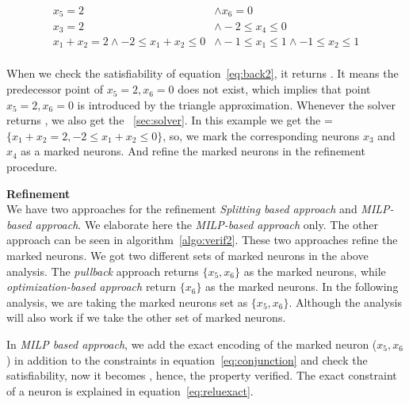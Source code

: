 \begin{equation}
    \begin{aligned}
        x_5 = 2 & \land x_6 = 0 \\
        x_3 = 2 & \land -2\leq x_4 \leq 0 \\ 
        x_1+x_2=2\land -2\leq  x_1+x_2 \leq 0 & \land -1\leq x_1 \leq 1 \land -1\leq x_2 \leq 1 \\
    \end{aligned}
\label{eq:back2}
\end{equation}

When we check the satisfiability of equation~\ref{eq:back2}, it returns \unsat{}. It means the predecessor point of 
$x_5=2,x_6=0$ does not exist, which implies that point $x_5=2, x_6=0$ is introduced by the triangle approximation.
Whenever the solver returns \unsat{}, we also get the \unsatcore{}~\ref{sec:solver}. In this example we get the 
\unsatcore{}=$\{x_1+x_2=2, -2\leq  x_1+x_2 \leq 0\}$, so, we mark the corresponding neurons $x_3$ and $x_4$ as a marked neurons. 
And refine the marked neurons in the refinement procedure. 


\textbf{Refinement} \\
We have two approaches for the refinement {\em Splitting based approach} and {\em MILP-based approach}.
We elaborate here the {\em MILP-based approach} only. The other approach can be seen in algorithm~\ref{algo:verif2}. 
These two approaches refine the marked neurons. We got two different sets of marked neurons in the above analysis. 
The {\em pullback} approach returns $\{x_5, x_6\}$ as the marked neurons, while {\em optimization-based approach}
return $\{x_6\}$ as the marked neurons. In the following analysis, we are taking the marked neurons set as $\{x_5, x_6\}$.
Although the analysis will also work if we take the other set of marked neurons.

In {\em MILP based approach}, we add the exact encoding of the marked neuron ($x_5, x_6$) in addition to the constraints
in equation~\ref{eq:conjunction} and check the satisfiability, now it becomes \unsat{}, hence, the property verified. 
The exact constraint of a \relu{} neuron is explained in equation~\ref{eq:reluexact}. 

